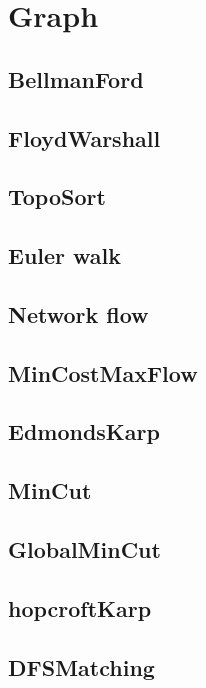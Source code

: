 \chapter{Graph}

\section{BellmanFord}
\section{FloydWarshall}
\section{TopoSort}

\section{Euler walk}

\section{Network flow}
\section{MinCostMaxFlow}
\section{EdmondsKarp}
\section{MinCut}
\section{GlobalMinCut}

\section{hopcroftKarp}
\section{DFSMatching}
